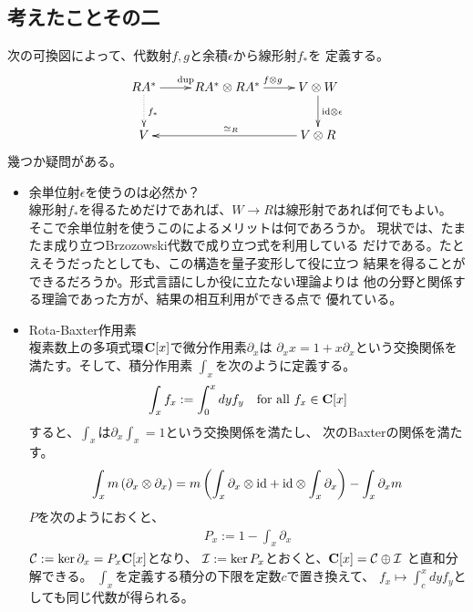 {\subsection{考えたことその二}\label{s2:考えたことその二} %
	次の可換図によって、代数射$f,g$と余積$\epsilon$から線形射$f_*$を
	定義する。
	\begin{equation*}\begin{split}
		\xymatrix{
			RA^* \ar[r]^{\myop{dup}} \ar@{.>}[d]^{f_*} 
			& RA^*\otimes RA^* \ar[r]^{f\otimes g}
			& V\otimes W \ar[d]^{\id\otimes\epsilon} \\
			V & & V\otimes R \ar[ll]_{\simeq_R} \\
		}
	\end{split}\end{equation*}
	幾つか疑問がある。
	\begin{itemize}\setlength{\itemsep}{-1mm} %
		\item 余単位射$\epsilon$を使うのは必然か？ \\
		線形射$f_*$を得るためだけであれば、$W\to R$は線形射であれば何でもよい。
		そこで余単位射を使うこのによるメリットは何であろうか。
		現状では、たまたま成り立つBrzozowski代数で成り立つ式を利用している
		だけである。たとえそうだったとしても、この構造を量子変形して役に立つ
		結果を得ることができるだろうか。形式言語にしか役に立たない理論よりは
		他の分野と関係する理論であった方が、結果の相互利用ができる点で
		優れている。
		\item Rota-Baxter作用素 \\
		複素数上の多項式環$\mathbf{C}[x]$で微分作用素$\partial_x$は
		$\partial_xx=1+x\partial_x$という交換関係を満たす。そして、積分作用素
		$\int_x$を次のように定義する。
		\begin{equation*}\begin{split}
			\int_x f_x := \int_0^x dy f_y \quad\text{for all } f_x\in\mathbf{C}[x]
		\end{split}\end{equation*}
		すると、$\int_x$は$\partial_x\int_x=1$という交換関係を満たし、
		次のBaxterの関係を満たす。
		\begin{equation*}\begin{split}
			\int_xm\left({\partial_x\otimes\partial_x}\right)
			= m\left({\int_x\partial_x\otimes{\ensuremath{\operatorname{id}}} + {\operatorname{id}}\otimes\int_x\partial_x}\right)
			- \int_x\partial_xm
		\end{split}\end{equation*}
		$P$を次のようにおくと、
		\begin{equation*}\begin{split}
			P_x := 1 - \int_x\partial_x
		\end{split}\end{equation*}
		${{\mathcal{C}}}:=\ker\partial_x=P_x\mathbf{C}[x]$となり、
		${{\mathcal{I}}}:=\ker P_x$とおくと、$\mathbf{C}[x]={{\mathcal{C}}}\oplus{\ensuremath{{\mathcal{I}}}}$
		と直和分解できる。
		$\int_x$を定義する積分の下限を定数$c$で置き換えて、
		$f_x\mapsto\int_c^xdyf_y$としても同じ代数が得られる。
	\end{itemize} %
}
